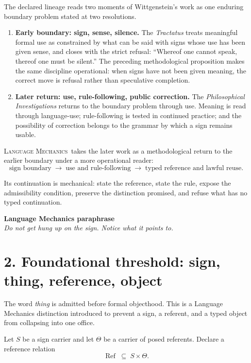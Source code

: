 \documentclass[10.5pt]{article}
\newcommand{\LM}{\textsc{Language Mechanics}}
\newcommand{\LMRef}{\operatorname{Ref}}
\begin{document}
The declared lineage reads two moments of Wittgenstein's work as one enduring boundary problem stated at two resolutions.

\begin{enumerate}
\item \textbf{Early boundary: sign, sense, silence.} The \emph{Tractatus} treats meaningful formal use as constrained by what can be said with signs whose use has been given sense, and closes with the strict refusal: ``Whereof one cannot speak, thereof one must be silent.'' The preceding methodological proposition makes the same discipline operational: when signs have not been given meaning, the correct move is refusal rather than speculative completion.
\item \textbf{Later return: use, rule-following, public correction.} The \emph{Philosophical Investigations} returns to the boundary problem through use. Meaning is read through language-use; rule-following is tested in continued practice; and the possibility of correction belongs to the grammar by which a sign remains usable.
\end{enumerate}

\LM\ takes the later work as a methodological return to the earlier boundary under a more operational reader:
\[
\boxed{
\text{sign boundary}
\;\longrightarrow\;
\text{use and rule-following}
\;\longrightarrow\;
\text{typed reference and lawful reuse}.}
\]

Its continuation is mechanical: state the reference, state the rule, expose the admissibility condition, preserve the distinction promised, and refuse what has no typed continuation.

\begin{rulebox}
\centering
\textbf{Language Mechanics paraphrase}\\[3pt]
\emph{Do not get hung up on the sign. Notice what it points to.}
\end{rulebox}

\section*{2. Foundational threshold: sign, thing, reference, object}
The word \emph{thing} is admitted before formal objecthood. This is a Language Mechanics distinction introduced to prevent a sign, a referent, and a typed object from collapsing into one office.

Let $S$ be a sign carrier and let $\Theta$ be a carrier of posed referents. Declare a reference relation
\[
\LMRef\;\subseteq\;S\times\Theta.
\]
\end{document}
